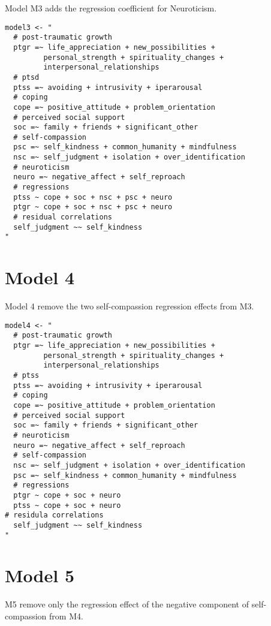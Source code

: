 \documentclass[aps,floatfix,prl]{revtex4}
\begin{document}
Model M3 adds the regression coefficient for Neuroticism.

\begin{verbatim}
model3 <- "
  # post-traumatic growth
  ptgr =~ life_appreciation + new_possibilities + 
         personal_strength + spirituality_changes + 
         interpersonal_relationships
  # ptsd
  ptss =~ avoiding + intrusivity + iperarousal
  # coping
  cope =~ positive_attitude + problem_orientation 
  # perceived social support
  soc =~ family + friends + significant_other
  # self-compassion
  psc =~ self_kindness + common_humanity + mindfulness
  nsc =~ self_judgment + isolation + over_identification
  # neuroticism
  neuro =~ negative_affect + self_reproach
  # regressions
  ptss ~ cope + soc + nsc + psc + neuro
  ptgr ~ cope + soc + nsc + psc + neuro
  # residual correlations
  self_judgment ~~ self_kindness
"
\end{verbatim}

\newpage

\hypertarget{model-4}{%
\section{Model 4}\label{model-4}}

Model 4 remove the two self-compassion regression effects from M3.

\begin{verbatim}
model4 <- "
  # post-traumatic growth
  ptgr =~ life_appreciation + new_possibilities + 
         personal_strength + spirituality_changes + 
         interpersonal_relationships
  # ptss
  ptss =~ avoiding + intrusivity + iperarousal
  # coping
  cope =~ positive_attitude + problem_orientation 
  # perceived social support
  soc =~ family + friends + significant_other
  # neuroticism
  neuro =~ negative_affect + self_reproach
  # self-compassion
  nsc =~ self_judgment + isolation + over_identification
  psc =~ self_kindness + common_humanity + mindfulness
  # regressions
  ptgr ~ cope + soc + neuro
  ptss ~ cope + soc + neuro
# residula correlations
  self_judgment ~~ self_kindness
"
\end{verbatim}

\newpage

\hypertarget{model-5}{%
\section{Model 5}\label{model-5}}

M5 remove only the regression effect of the negative component of
self-compassion from M4.
\end{document}
